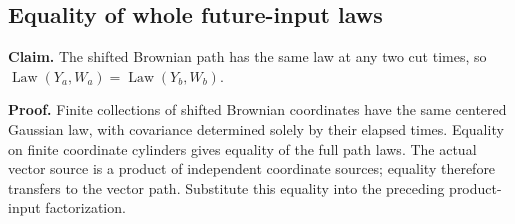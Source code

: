\documentclass[11pt,a4paper]{report}
\begin{document}
\subsection{\texorpdfstring{Equality of whole future-input laws}{Equality of whole future-input laws}}
\label{report-step-WassersteinMixing-ActualMarkovInput-lean-2}


\textbf{Claim.} The shifted Brownian path has the same law at any two cut times, so \(\operatorname{Law}(Y_a,W_a)=\operatorname{Law}(Y_b,W_b)\).



\textbf{Proof.} Finite collections of shifted Brownian coordinates have the same centered Gaussian law, with covariance determined solely by their elapsed times. Equality on finite coordinate cylinders gives equality of the full path laws. The actual vector source is a product of independent coordinate sources; equality therefore transfers to the vector path. Substitute this equality into the preceding product-input factorization.
\end{document}
